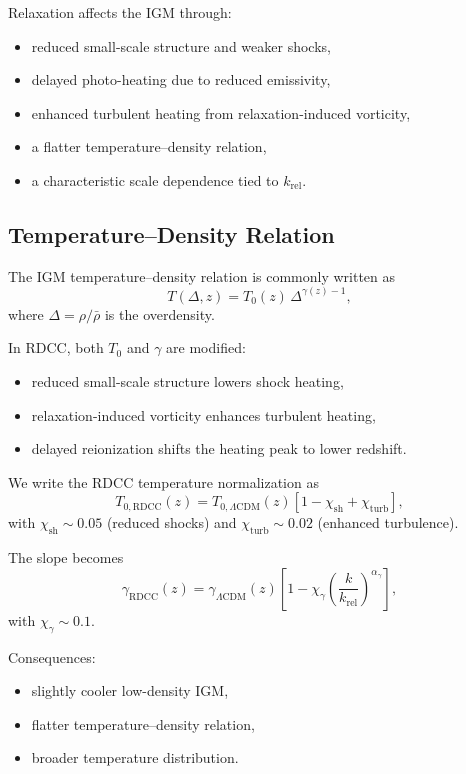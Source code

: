 \documentclass[11pt,a4paper]{article}
\begin{document}
Relaxation affects the IGM through:
\begin{itemize}
\item reduced small-scale structure and weaker shocks,
\item delayed photo-heating due to reduced emissivity,
\item enhanced turbulent heating from relaxation-induced vorticity,
\item a flatter temperature–density relation,
\item a characteristic scale dependence tied to $k_{\mathrm{rel}}$.
\end{itemize}

\subsection{Temperature–Density Relation}

The IGM temperature–density relation is commonly written as
\begin{equation}
T(\Delta,z)
=
T_{0}(z)\,
\Delta^{\gamma(z)-1},
\end{equation}
where $\Delta = \rho / \bar{\rho}$ is the overdensity.

In RDCC, both $T_{0}$ and $\gamma$ are modified:
\begin{itemize}
\item reduced small-scale structure lowers shock heating,
\item relaxation-induced vorticity enhances turbulent heating,
\item delayed reionization shifts the heating peak to lower redshift.
\end{itemize}

We write the RDCC temperature normalization as
\begin{equation}
T_{0,\mathrm{RDCC}}(z)
=
T_{0,\Lambda\mathrm{CDM}}(z)
\left[
1
-
\chi_{\mathrm{sh}}
+
\chi_{\mathrm{turb}}
\right],
\end{equation}
with $\chi_{\mathrm{sh}} \sim 0.05$ (reduced shocks) and $\chi_{\mathrm{turb}} \sim 0.02$ (enhanced turbulence).

The slope becomes
\begin{equation}
\gamma_{\mathrm{RDCC}}(z)
=
\gamma_{\Lambda\mathrm{CDM}}(z)
\left[
1
-
\chi_{\gamma}
\left(
\frac{k}{k_{\mathrm{rel}}}
\right)^{\alpha_{\gamma}}
\right],
\end{equation}
with $\chi_{\gamma} \sim 0.1$.

Consequences:
\begin{itemize}
\item slightly cooler low-density IGM,
\item flatter temperature–density relation,
\item broader temperature distribution.
\end{itemize}
\end{document}

